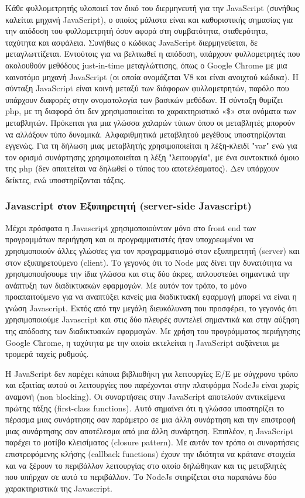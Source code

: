 		Κάθε φυλλομετρητής υλοποιεί τον δικό του διερμηνευτή για την JavaScript (συνήθως καλείται μηχανή JavaScript), ο οποίος μάλιστα είναι και καθοριστικής σημασίας για την απόδοση του φυλλομετρητή όσον αφορά στη συμβατότητα, σταθερότητα, ταχύτητα και ασφάλεια. Συνήθως ο κώδικας JavaScript διερμηνεύεται, δε μεταγλωττίζεται. Εντούτοις για να βελτιωθεί η απόδοση, υπάρχουν φυλλομετρητές που ακολουθούν μεθόδους just-in-time μεταγλώττισης, όπως ο Google Chrome με μια καινοτόμο μηχανή JavaScript (οι οποία ονομάζεται V8 και είναι ανοιχτού κώδικα).
		Η σύνταξη JavaScript είναι κοινή μεταξύ των διάφορων φυλλομετρητών, παρόλο που υπάρχουν διαφορές στην ονοματολογία των βασικών μεθόδων. Η σύνταξη θυμίζει php, με τη διαφορά ότι δεν χρησιμοποιείται το χαρακτηριστικό «\$» στα ονόματα των μεταβλητών. Πρόκειται για μια γλώσσα χαλαρών τύπων όπου οι μεταβλητές μπορούν να αλλάξουν τύπο δυναμικά. Αλφαριθμητικά μεταβλητού μεγέθους υποστηρίζονται εγγενώς. Για τη δήλωση μιας μεταβλητής χρησιμοποιείται η λέξη-κλειδί "var" ενώ για τον ορισμό συνάρτησης χρησιμοποιείται η λέξη "λειτουργία", με ένα συντακτικό όμοιο της php (δεν απαιτείται να δηλωθεί ο τύπος του αποτελέσματος). Δεν υπάρχουν δείκτες, ενώ υποστηρίζονται τάξεις. 

\subsubsection{Javascript στον Εξυπηρετητή (server-side Javascript)}

 
 Μέχρι πρόσφατα η Javascript χρησιμοποιούνταν μόνο στο front end των προγραμμάτων περιήγηση και οι προγραμματιστές ήταν υποχρεωμένοι να χρησιμοποιούν άλλες γλώσσες για τον προγραμματισμό στον εξυπηρετητή (server) και στον εξυπηρετούμενο (client). Το γεγονός ότι το Node μας δίνει την δυνατότητα να χρησιμοποιήσουμε την ίδια γλώσσα και στις δύο άκρες, απλουστεύει σημαντικά την ανάπτυξη των διαδικτυακών εφαρμογών.  Με αυτόν τον τρόπο, το μόνο προαπαιτούμενο για να αναπτύξει κανείς μια διαδικτυακή εφαρμογή μπορεί να είναι η γνώση Javascript. Εκτός από την μεγάλη διευκόλυνση που προσφέρει, το γεγονός ότι χρησιμοποιούμε Javascript και στις δύο πλευρές συντελεί σημαντικά και στην αύξηση της απόδοσης των διαδικτυακών εφαρμογών. Με χρήση του προγράμματος περιήγησης Google Chrome, η ταχύτητα με την οποία εκτελείται η JavaScript αυξάνεται με τρομερά ταχείς ρυθμούς.

Η JavaScript δεν παρέχει κάποια βιβλιοθήκη για λειτουργίες Ε/Ε με σύγχρονο τρόπο και εξαιτίας αυτού  οι λειτουργίες που παρέχονται στην πλατφόρμα NodeJs είναι χωρίς αναμονή (non blocking). Οι συναρτήσεις στην JavaScript αποτελούν αντικείμενα πρώτης τάξης (first-class functions). Αυτό σημαίνει ότι η γλώσσα υποστηρίζει το πέρασμα μιας συνάρτησης σαν παράμετρο σε μια άλλη συνάρτηση και την επιστροφή μιας συνάρτησης σαν αποτέλεσμα από μια άλλη συνάρτηση. Επιπλέον, η JavaScript παρέχει το μοτίβο κλεισίματος (closure pattern). Με αυτόν τον τρόπο οι συναρτήσεις επιστρεφόμενης κλήσης (callback functions) έχουν την ιδιότητα να κράτανε στοιχεία και να ξέρουν το περιβάλλον λειτουργίας στο οποίο δηλώθηκαν και τις μεταβλητές που υπήρχαν σε αυτό το περιβάλλον.  Το NodeJs στηρίζεται στα παραπάνω δύο χαρακτηριστικά της Javascript.

